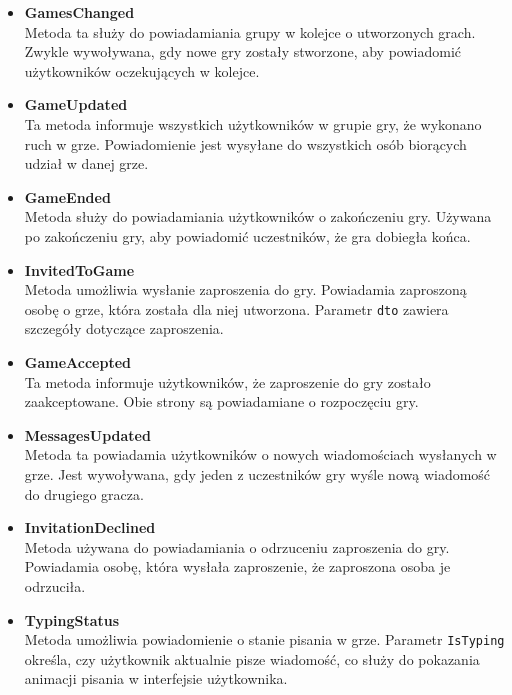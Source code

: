 \documentclass[12pt,a4paper]{article}
\begin{document}
\begin{itemize}
    \item \textbf{GamesChanged} \\
    Metoda ta służy do powiadamiania grupy w kolejce o utworzonych grach. Zwykle wywoływana, gdy nowe gry zostały stworzone, aby powiadomić użytkowników oczekujących w kolejce.

    \item \textbf{GameUpdated} \\
    Ta metoda informuje wszystkich użytkowników w grupie gry, że wykonano ruch w grze. Powiadomienie jest wysyłane do wszystkich osób biorących udział w danej grze.

    \item \textbf{GameEnded} \\
    Metoda służy do powiadamiania użytkowników o zakończeniu gry. Używana po zakończeniu gry, aby powiadomić uczestników, że gra dobiegła końca.

    \item \textbf{InvitedToGame} \\
    Metoda umożliwia wysłanie zaproszenia do gry. Powiadamia zaproszoną osobę o grze, która została dla niej utworzona. Parametr \texttt{dto} zawiera szczegóły 
    dotyczące zaproszenia.

    \item \textbf{GameAccepted} \\
    Ta metoda informuje użytkowników, że zaproszenie do gry zostało zaakceptowane. Obie strony są powiadamiane o rozpoczęciu gry.

    \item \textbf{MessagesUpdated} \\
    Metoda ta powiadamia użytkowników o nowych wiadomościach wysłanych w grze. Jest wywoływana, gdy jeden z uczestników gry wyśle nową wiadomość do drugiego gracza.

    \item \textbf{InvitationDeclined} \\
    Metoda używana do powiadamiania o odrzuceniu zaproszenia do gry. Powiadamia osobę, która wysłała zaproszenie, że zaproszona osoba je odrzuciła.
    
    \item \textbf{TypingStatus} \\
    Metoda umożliwia powiadomienie o stanie pisania w grze. Parametr \texttt{IsTyping} określa, czy użytkownik aktualnie pisze wiadomość, co służy do pokazania animacji pisania w interfejsie użytkownika.


\end{itemize}
\end{document}
